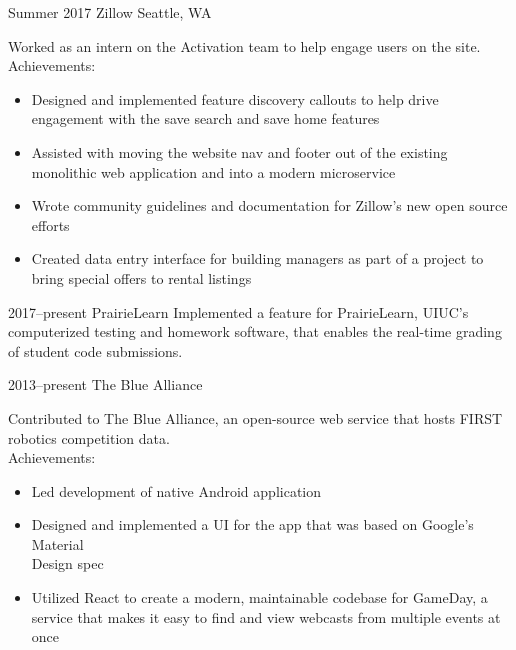 \documentclass[nofooter,print]{resume}
\begin{document}
\begin{entrylist}


\entry
{Summer 2017}
{Zillow}
{Seattle, WA}
{Worked as an intern on the Activation team to help engage users on the site. \\
Achievements:
\noindent\begin{itemize}[leftmargin=0.45cm]
\item Designed and implemented feature discovery callouts to help drive engagement with the save search and save home features
\item Assisted with moving the website nav and footer out of the existing monolithic web application and into a modern microservice
\item Wrote community guidelines and documentation for Zillow's new open source efforts
\item Created data entry interface for building managers as part of a project to bring special offers to rental listings
\end{itemize}}


\entry
{2017--present}
{PrairieLearn}
{}
{Implemented a feature for PrairieLearn, UIUC's computerized testing and homework software, that enables the real-time grading of student code submissions.}


\entry
{2013--present}
{The Blue Alliance}
{}
{Contributed to The Blue Alliance, an open-source web service that hosts FIRST robotics competition data. \\
Achievements:
\noindent\begin{itemize}[leftmargin=0.45cm]
\item Led development of native Android application
\item Designed and implemented a UI for the app that was based on Google's Material \\Design spec
\item Utilized React to create a modern, maintainable codebase for GameDay, a service that makes it easy to find and view webcasts from multiple events at once
\end{itemize}}

\end{entrylist}

\end{document}
